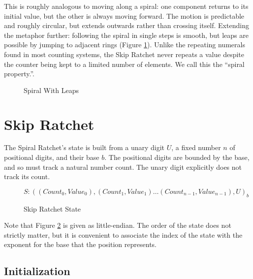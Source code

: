 \documentclass{article}
\begin{document}
	This is roughly analogous to moving along a spiral: one component returns to its initial value, but the other is always moving forward. The motion is predictable and roughly circular, but extends outwards rather than crossing itself. Extending the metaphor further: following the spiral in single steps is smooth, but leaps are possible by jumping to adjacent rings (Figure \ref{fig:spiral-metaphor}). Unlike the repeating numerals found in most counting systems, the Skip Ratchet never repeats a value despite the counter being kept to a limited number of elements. We call this the ``spiral property.''.
	
	\begin{figure}[h]
		\centering
		
		
		\caption{Spiral With Leaps}
		\label{fig:spiral-metaphor}
	\end{figure}

	\FloatBarrier
	
	\section{Skip Ratchet}
	
	The Spiral Ratchet's state is built from a unary digit $U$, a fixed number $n$ of positional digits, and their base $b$. The positional digits are bounded by the base, and so must track a natural number count. The unary digit explicitly does not track its count.
	
	\begin{figure}[h]
		\centering
		
		$S : ((Count_{0}, Value_{0}), (Count_{1}, Value_{1}) \ldots (Count_{n-1}, Value_{n-1}), U)_{b}$
		
		\caption{Skip Ratchet State}
		\label{fig:state}
	\end{figure}

	Note that Figure \ref{fig:state} is given as little-endian. The order of the state does not strictly matter, but it is convenient to associate the index of the state with the exponent for the base that the position represents.
	
	\subsection{Initialization}
	
\end{document}
